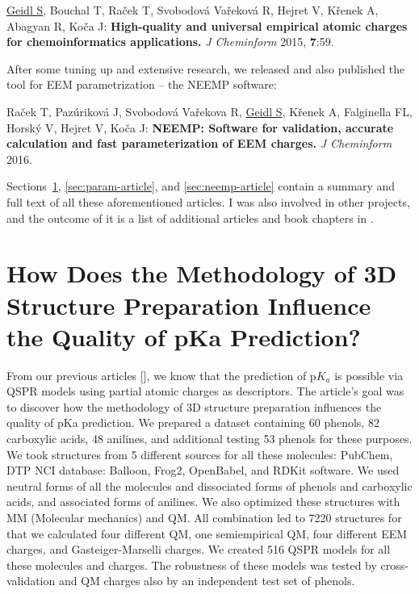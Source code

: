 \underline{Geidl S}, Bouchal T, Raček T, Svobodová Vařeková R, Hejret V,
Křenek A, Abagyan R, Koča J: \textbf{High-quality and universal empirical atomic
charges for chemoinformatics applications.} \textit{J Cheminform} 2015,
\textbf{7}:59.

After some tuning up and extensive research, we released and also published
the tool for EEM parametrization -- the NEEMP software:

Raček T, Pazúriková J, Svobodová Vařekova R, \underline{Geidl S}, Křenek A,
Falginella FL, Horský V, Hejret V, Koča J: \textbf{NEEMP: Software
for validation, accurate calculation and fast parameterization of EEM charges.}
\textit{J Cheminform} 2016.


Sections~\ref{sec:pka-article}, \ref{sec:param-article}, and
\ref{sec:neemp-article} contain a summary and  full text of
all these aforementioned articles. I was also involved in other projects, and
the outcome of it is a list of additional articles and book chapters
in .

\section{How Does the Methodology of 3D Structure Preparation Influence
the Quality of pKa Prediction?} \label{sec:pka-article}

From our previous articles [], we know that
the prediction of p$K_a$ is possible via QSPR models using partial atomic
charges as descriptors. The article's goal was to discover how the methodology
of 3D structure preparation influences the quality of pKa prediction.
We prepared a dataset containing 60 phenols, 82 carboxylic acids, 48 anilines,
and additional testing 53 phenols for these purposes. We took structures
from 5 different sources for all these molecules: PubChem, DTP NCI database:
Balloon, Frog2, OpenBabel, and RDKit software. We used neutral forms of all
the molecules and dissociated forms of phenols and carboxylic acids, and
associated forms of anilines. We also optimized these structures with MM
(Molecular mechanics) and QM. All combination led to 7220 structures for that
we calculated four different QM, one semiempirical QM, four different EEM
charges, and Gasteiger-Marselli charges. We created 516 QSPR models for all
these molecules and charges. The robustness of these models was tested by
cross-validation and QM charges also by an independent test set of phenols.

